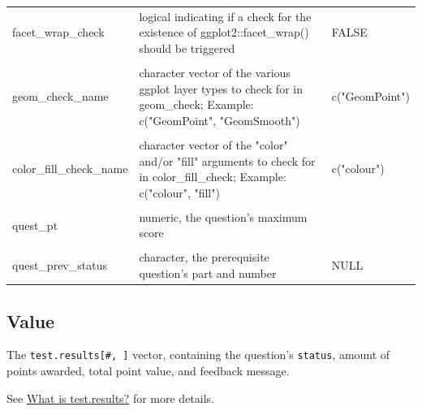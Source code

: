 \documentclass[
  12pt,
]{book}
\begin{document}
\begin{longtable}{>{\raggedright\arraybackslash}p{4cm}>{\raggedright\arraybackslash}p{8cm}>{\raggedright\arraybackslash}p{4cm}}
\hline
\cellcolor{gray!10}{data\_check} & \cellcolor{gray!10}{logical indicating if a check for the correct data associated with the x-y aesthetics should be triggered; requires aesthetic\_check} & \cellcolor{gray!10}{FALSE}\\
\hline
facet\_wrap\_check & logical indicating if a check for the existence of ggplot2::facet\_wrap() should be triggered & FALSE\\
\hline
\cellcolor{gray!10}{geom\_check} & \cellcolor{gray!10}{logical indicating if an existence check for ggplot layer types (e.g., ggplot2::geom\_point()) should be triggered; requires geom\_check\_name} & \cellcolor{gray!10}{FALSE}\\
\hline
geom\_check\_name & character vector of the various ggplot layer types to check for in geom\_check; Example: c("GeomPoint", "GeomSmooth") & c("GeomPoint")\\
\hline
\cellcolor{gray!10}{color\_fill\_check} & \cellcolor{gray!10}{logical indicating if an existence check for the "color" and/or "fill" arguments should be triggered; requires color\_fill\_check\_name} & \cellcolor{gray!10}{FALSE}\\
\hline
color\_fill\_check\_name & character vector of the "color" and/or "fill" arguments to check for in color\_fill\_check; Example: c("colour", "fill") & c("colour")\\
\hline
\cellcolor{gray!10}{quest\_num} & \cellcolor{gray!10}{numeric, the question's number} & \cellcolor{gray!10}{0}\\
\hline
quest\_pt & numeric, the question's maximum score & 0\\
\hline
\cellcolor{gray!10}{quest\_prev} & \cellcolor{gray!10}{numeric, the prerequisite question's number} & \cellcolor{gray!10}{1}\\
\hline
quest\_prev\_status & character, the prerequisite question's part and number & NULL\\
\bottomrule
\end{longtable}

\subsection*{Value}\label{value-1}

The \texttt{test.results{[}\#,\ {]}} vector, containing the question's \texttt{status}, amount of points awarded, total point value, and feedback message.

See \hyperref[test.results]{What is test.results?} for more details.
\end{document}
